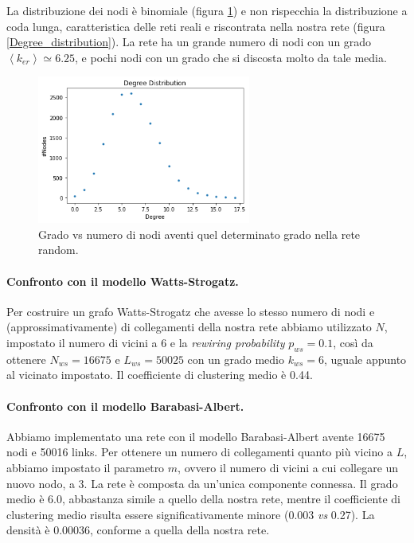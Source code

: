     La distribuzione dei nodi è binomiale (figura \ref{Random_model_distribution}) e non rispecchia la distribuzione a coda lunga, caratteristica delle reti reali e riscontrata nella nostra rete (figura \ref{Degree_distribution}).
    La rete ha un grande numero di nodi con un grado $\left<k_{er}\right> \simeq 6.25$, e pochi nodi con un grado che si discosta molto da tale media. 
    
     \begin{figure}[ht]
            \centering
            \includegraphics[width=7cm] {3_analysis_network/poissont.png}
            \caption{Grado vs numero di nodi aventi quel determinato grado nella rete random.}
            \label{Random_model_distribution}
        \end{figure}
    
     \paragraph{\tab Confronto con il modello Watts-Strogatz.}
     Per costruire un grafo Watts-Strogatz che avesse lo stesso numero di nodi e (approssimativamente) di collegamenti della nostra rete abbiamo utilizzato $N$, impostato il numero di vicini a 6 e la \textit{rewiring probability} $p_{ws} = 0.1$, così da ottenere $N_{ws}=16675$ e $L_{ws}=50025$ con un grado medio $k_{ws} = 6$, uguale appunto al vicinato impostato. Il coefficiente di clustering medio è 0.44.
    
     \paragraph{\tab Confronto con il modello Barabasi-Albert.} Abbiamo implementato una rete con il modello Barabasi-Albert avente 16675 nodi e 50016 links. Per ottenere un numero di collegamenti quanto più vicino a $L$, abbiamo impostato il parametro $m$, ovvero il numero di vicini a cui collegare un nuovo nodo, a 3. La rete è composta da un’unica componente connessa. Il grado medio è 6.0, abbastanza simile a quello della nostra rete, mentre il coefficiente di clustering medio risulta essere significativamente minore (0.003 \textit{vs} 0.27). La densità è 0.00036, conforme a quella della nostra rete.
    
